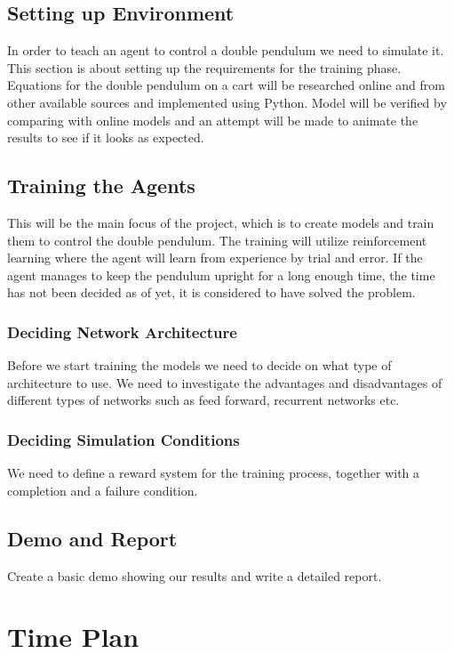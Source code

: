 \documentclass{article}
\begin{document}
\subsection{Setting up Environment}
In order to teach an agent to control a double pendulum we need to simulate it.
This section is about setting up the requirements for the training phase.
Equations for the double pendulum on a cart will be researched online and from other available sources and implemented using Python.
Model will be verified by comparing with online models and an attempt will be made to animate the results to see if it looks as expected.

\subsection{Training the Agents}
This will be the main focus of the project, which is to create models and train them to control the double pendulum.
The training will utilize reinforcement learning where the agent will learn from experience by trial and error.
If the agent manages to keep the pendulum upright for a long enough time, the time has not been decided as of yet, it is considered to have solved the problem.
\subsubsection{Deciding Network Architecture}
Before we start training the models we need to decide on what type of architecture to use. We need to investigate the advantages and disadvantages of different types of networks such as feed forward, recurrent networks etc.
\subsubsection{Deciding Simulation Conditions}
We need to define a reward system for the training process, together with a completion and a failure condition.

\subsection{Demo and Report}
Create a basic demo showing our results and write a detailed report.

\section{Time Plan}
\end{document}
